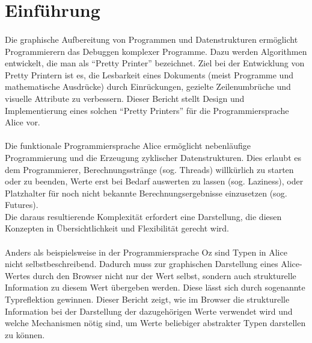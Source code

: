 \documentclass[12pt,a4paper]{article}
\begin{document}

\section{Einf\"{u}hrung}  

\paragraph{}

Die graphische Aufbereitung von Programmen und Datenstrukturen erm\"{o}glicht 
Programmierern das Debuggen komplexer Programme. 
Dazu werden Algorithmen entwickelt, die man als ``Pretty Printer'' bezeichnet. 
Ziel bei der Entwicklung von Pretty Printern ist es, die Lesbarkeit eines 
Dokuments (meist Programme und mathematische Ausdr\"{u}cke) durch 
Einr\"{u}ckungen, gezielte Zeilenumbr\"{u}che und 
visuelle Attribute zu verbessern.
Dieser Bericht stellt Design und Implementierung 
eines solchen ``Pretty Printers'' f\"{u}r die Programmiersprache Alice vor. 

\paragraph{}

Die funktionale Programmiersprache Alice erm\"{o}glicht nebenl\"{a}ufige 
Programmierung und die Erzeugung zyklischer Datenstrukturen. 
Dies erlaubt es dem Programmierer, Berechnungsstr\"{a}nge (sog. Threads) 
willk\"{u}rlich zu starten oder zu beenden, Werte erst bei 
Bedarf auswerten zu lassen (sog. Laziness), oder Platzhalter 
f\"{u}r noch nicht bekannte Berechnungsergebnisse einzusetzen (sog. Futures).
\\
Die daraus resultierende Komplexit\"{a}t erfordert eine Darstellung, 
die diesen Konzepten in \"{U}bersichtlichkeit und Flexibilit\"{a}t gerecht 
wird.

\paragraph{}

Anders als beispielsweise in der Programmiersprache Oz sind 
Typen in Alice nicht selbstbeschreibend. Dadurch muss zur 
graphischen Darstellung eines Alice-Wertes durch den 
Browser nicht nur 
der Wert selbst, sondern auch strukturelle 
Information zu diesem Wert \"{u}bergeben werden. Diese l\"{a}sst sich durch 
sogenannte Typreflektion gewinnen. Dieser Bericht zeigt, 
wie im Browser die strukturelle Information 
bei der Darstellung der dazugeh\"{o}rigen Werte verwendet wird und 
welche Mechanismen n\"{o}tig sind, um Werte beliebiger abstrakter Typen 
darstellen zu k\"{o}nnen.
\end{document}
